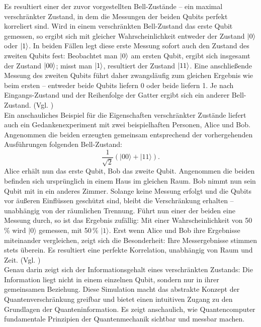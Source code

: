 Es resultiert einer der zuvor vorgestellten Bell-Zustände – ein maximal verschränkter Zustand, in dem die Messungen der beiden Qubits perfekt korreliert sind. Wird in einem verschränkten Bell-Zustand das erste Qubit gemessen, so ergibt sich mit gleicher Wahrscheinlichkeit entweder der Zustand \( \ket{0} \) oder \( \ket{1} \). In beiden Fällen legt diese erste Messung sofort auch den Zustand des zweiten Qubits fest: Beobachtet man \( \ket{0} \) am ersten Qubit, ergibt sich insgesamt der Zustand \( \ket{00} \); misst man \( \ket{1} \), resultiert der Zustand \( \ket{11} \). Eine anschließende Messung des zweiten Qubits führt daher zwangsläufig zum gleichen Ergebnis wie beim ersten – entweder beide Qubits liefern 0 oder beide liefern 1. Je nach Eingangs-Zustand und der Reihenfolge der Gatter ergibt sich ein anderer Bell-Zustand. (Vgl. \cite[S.53-54]{homeister_quantum_2022})
\\


Ein anschauliches Beispiel für die Eigenschaften verschränkter Zustände liefert auch ein Gedankenexperiment mit zwei beispielhaften Personen, Alice und Bob. Angenommen die beiden erzeugten gemeinsam entsprechend der vorhergehenden Ausführungen folgenden Bell-Zustand:
\[
\frac{1}{\sqrt{2}} (|00\rangle + |11\rangle).
\]
Alice erhält nun das erste Qubit, Bob das zweite Qubit. Angenommen die beiden befinden sich ursprünglich in einem Haus im gleichen Raum. Bob nimmt nun sein Qubit mit in ein anderes Zimmer. Solange keine Messung erfolgt und die Qubits vor äußeren Einflüssen geschützt sind, bleibt die Verschränkung erhalten – unabhängig von der räumlichen Trennung. Führt nun einer der beiden eine Messung durch, so ist das Ergebnis zufällig: Mit einer Wahrscheinlichkeit von 50\,\% wird $|0\rangle$ gemessen, mit 50\,\% $|1\rangle$. Erst wenn Alice und Bob ihre Ergebnisse miteinander vergleichen, zeigt sich die Besonderheit: Ihre Messergebnisse stimmen stets überein. Es resultiert eine perfekte Korrelation, unabhängig von Raum und Zeit. (Vgl. \cite[S.54]{homeister_quantum_2022})
\\


Genau darin zeigt sich der Informationsgehalt eines verschränkten Zustands: Die Information liegt nicht in einem einzelnen Qubit, sondern nur in ihrer gemeinsamen Beziehung. Diese Simulation macht das abstrakte Konzept der Quantenverschränkung greifbar und bietet einen intuitiven Zugang zu den Grundlagen der Quanteninformation. Es zeigt anschaulich, wie Quantencomputer fundamentale Prinzipien der Quantenmechanik sichtbar und messbar machen. 

